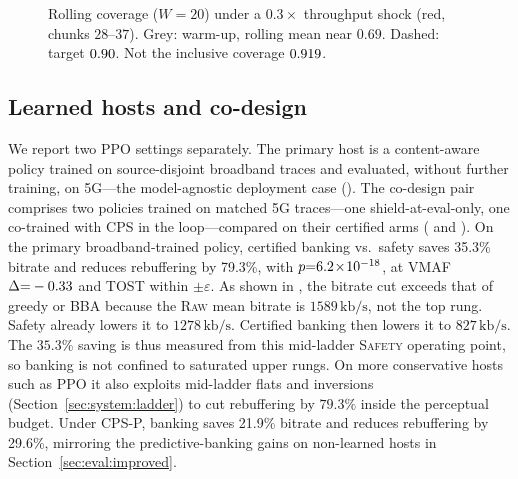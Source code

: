 \begin{figure}[!htbp]
    \centering
    \caption{Rolling coverage (\(W{=}20\)) under a \(0.3\times\) throughput shock (red, chunks \(28\)--\(37\)). Grey: warm-up, rolling mean near \(0.69\). Dashed: target \(0.90\). Not the inclusive coverage \(0.919\).}
    \label{fig:cps:coverage_drift}
\end{figure}

\subsection{Learned hosts and co-design}
\label{sec:eval:codesign}

We report two PPO settings separately. The primary host is a content-aware policy trained on source-disjoint broadband traces and evaluated, without further training, on \mbox{5G}---the model-agnostic deployment case (). The co-design pair comprises two policies trained on matched \mbox{5G} traces---one shield-at-eval-only, one co-trained with CPS in the loop---compared on their certified arms ( and ).
On the primary broadband-trained policy, certified banking vs.\ safety saves 35.3\% bitrate and reduces rebuffering by 79.3\%, with \(p{=}6.2\!\times\!10^{-18}\), at VMAF \(\Delta{=}-0.33\) and TOST within \(\pm\varepsilon\).
As shown in , the bitrate cut exceeds that of greedy or BBA because the \textsc{Raw} mean bitrate is \(1589\,\mathrm{kb/s}\), not the top rung. Safety already lowers it to \(1278\,\mathrm{kb/s}\). Certified banking then lowers it to \(827\,\mathrm{kb/s}\).
The \(35.3\%\) saving is thus measured from this mid-ladder \textsc{Safety} operating point, so banking is not confined to saturated upper rungs.
On more conservative hosts such as PPO it also exploits mid-ladder flats and inversions (Section~\ref{sec:system:ladder}) to cut rebuffering by \(79.3\%\) inside the perceptual budget.
Under CPS-P, banking saves 21.9\% bitrate and reduces rebuffering by 29.6\%, mirroring the predictive-banking gains on non-learned hosts in Section~\ref{sec:eval:improved}.

\begin{cps@table}
  \centering
  \caption{Paired arms for the primary PPO host on the \mbox{5G} test pool (broadband-trained policy, \(\CPSepisodes\) episodes, \(\varepsilon{=}\CPSepsilon\), \(\alpha{=}\CPSalpha\)). Certified vs.\ safety: \(\CPSPropBWcs\%\) bitrate, \(\CPSPropRebCs\%\) rebuffering.}
  \label{tab:cps:ppo}
  \small
  \evaltable{}
\end{cps@table}

